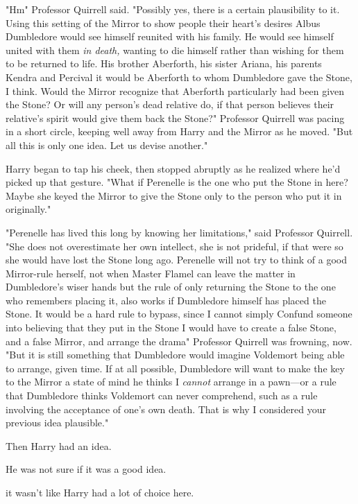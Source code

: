 "Hm{\el}" Professor Quirrell said. "Possibly{\el} yes, there is a certain
plausibility to it. Using this setting of the Mirror to show people their
heart's desires{\el} Albus Dumbledore would see himself reunited with his
family. He would see himself united with them \emph{in death,} wanting to die
himself rather than wishing for them to be returned to life. His brother
Aberforth, his sister Ariana, his parents Kendra and Percival{\el} it would
be Aberforth to whom Dumbledore gave the Stone, I think. Would the Mirror
recognize that Aberforth particularly had been given the Stone? Or will any
person's dead relative do, if that person believes their relative's spirit
would give them back the Stone?" Professor Quirrell was pacing in a short
circle, keeping well away from Harry and the Mirror as he moved. "But all this
is only one idea. Let us devise another."

Harry began to tap his cheek, then stopped abruptly as he realized where he'd
picked up that gesture. "What if Perenelle is the one who put the Stone in
here? Maybe she keyed the Mirror to give the Stone only to the person who put
it in originally."

"Perenelle has lived this long by knowing her limitations," said Professor
Quirrell. "She does not overestimate her own intellect, she is not prideful, if
that were so she would have lost the Stone long ago. Perenelle will not try to
think of a good Mirror-rule herself, not when Master Flamel can leave the
matter in Dumbledore's wiser hands{\el} but the rule of only returning the
Stone to the one who remembers placing it, also works if Dumbledore himself has
placed the Stone. It would be a hard rule to bypass, since I cannot simply
Confund someone into believing that they put in the Stone{\el} I would have
to create a false Stone, and a false Mirror, and arrange the drama{\el}"
Professor Quirrell was frowning, now. "But it is still something that
Dumbledore would imagine Voldemort being able to arrange, given time. If at all
possible, Dumbledore will want to make the key to the Mirror a state of mind he
thinks I \emph{cannot} arrange in a pawn—or a rule that Dumbledore thinks
Voldemort can never comprehend, such as a rule involving the acceptance of
one's own death. That is why I considered your previous idea plausible."

Then Harry had an idea.

He was not sure if it was a good idea.

{\el} it wasn't like Harry had a lot of choice here.

